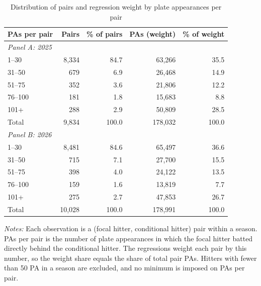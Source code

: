 \begin{table}[H]
\centering
\small
\caption{Distribution of pairs and regression weight by plate appearances per pair}
\label{tab:pair_pa_distribution}
\begin{tabular}{lrrrr}
\toprule
PAs per pair & Pairs & \% of pairs & PAs (weight) & \% of weight \\
\midrule
\multicolumn{5}{l}{\textit{Panel A: 2025}} \\
1--30 & 8,334 & 84.7 & 63,266 & 35.5 \\
31--50 & 679 & 6.9 & 26,468 & 14.9 \\
51--75 & 352 & 3.6 & 21,806 & 12.2 \\
76--100 & 181 & 1.8 & 15,683 & 8.8 \\
101+ & 288 & 2.9 & 50,809 & 28.5 \\
\addlinespace
Total & 9,834 & 100.0 & 178,032 & 100.0 \\
\midrule
\multicolumn{5}{l}{\textit{Panel B: 2026}} \\
1--30 & 8,481 & 84.6 & 65,497 & 36.6 \\
31--50 & 715 & 7.1 & 27,700 & 15.5 \\
51--75 & 398 & 4.0 & 24,122 & 13.5 \\
76--100 & 159 & 1.6 & 13,819 & 7.7 \\
101+ & 275 & 2.7 & 47,853 & 26.7 \\
\addlinespace
Total & 10,028 & 100.0 & 178,991 & 100.0 \\
\bottomrule
\end{tabular}
\par\smallskip\parbox{0.9\textwidth}{\footnotesize \textit{Notes:} Each observation is a (focal hitter, conditional hitter) pair within a season. PAs per pair is the number of plate appearances in which the focal hitter batted directly behind the conditional hitter. The regressions weight each pair by this number, so the weight share equals the share of total pair PAs. Hitters with fewer than 50 PA in a season are excluded, and no minimum is imposed on PAs per pair.}
\end{table}
